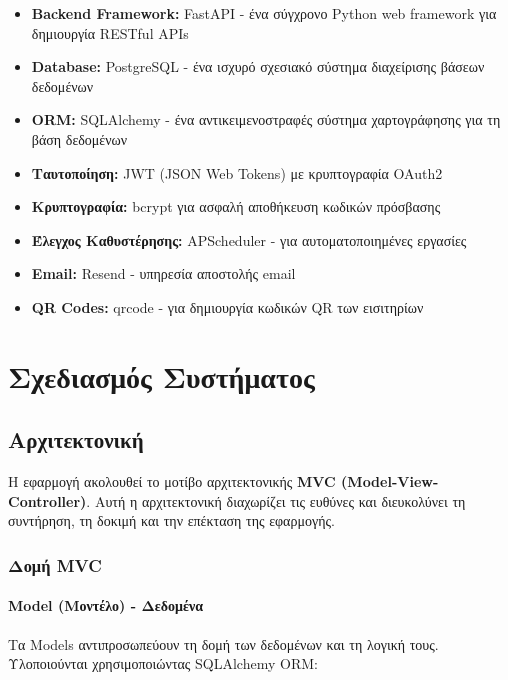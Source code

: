 \documentclass[12pt,a4paper]{report}
\begin{document}
\begin{itemize}
    \item \textbf{Backend Framework:} FastAPI - ένα σύγχρονο Python web framework για δημιουργία RESTful APIs
    \item \textbf{Database:} PostgreSQL - ένα ισχυρό σχεσιακό σύστημα διαχείρισης βάσεων δεδομένων
    \item \textbf{ORM:} SQLAlchemy - ένα αντικειμενοστραφές σύστημα χαρτογράφησης για τη βάση δεδομένων
    \item \textbf{Ταυτοποίηση:} JWT (JSON Web Tokens) με κρυπτογραφία OAuth2
    \item \textbf{Κρυπτογραφία:} bcrypt για ασφαλή αποθήκευση κωδικών πρόσβασης
    \item \textbf{Έλεγχος Καθυστέρησης:} APScheduler - για αυτοματοποιημένες εργασίες
    \item \textbf{Email:} Resend - υπηρεσία αποστολής email
    \item \textbf{QR Codes:} qrcode - για δημιουργία κωδικών QR των εισιτηρίων
\end{itemize}

\newpage

\chapter{Σχεδιασμός Συστήματος}

\section{Αρχιτεκτονική}

Η εφαρμογή ακολουθεί το μοτίβο αρχιτεκτονικής \textbf{MVC (Model-View-Controller)}. Αυτή η αρχιτεκτονική διαχωρίζει τις ευθύνες και διευκολύνει τη συντήρηση, τη δοκιμή και την επέκταση της εφαρμογής.

\subsection{Δομή MVC}

\subsubsection{Model (Μοντέλο) - Δεδομένα}

Τα Models αντιπροσωπεύουν τη δομή των δεδομένων και τη λογική τους. Υλοποιούνται χρησιμοποιώντας SQLAlchemy ORM:
\end{document}
